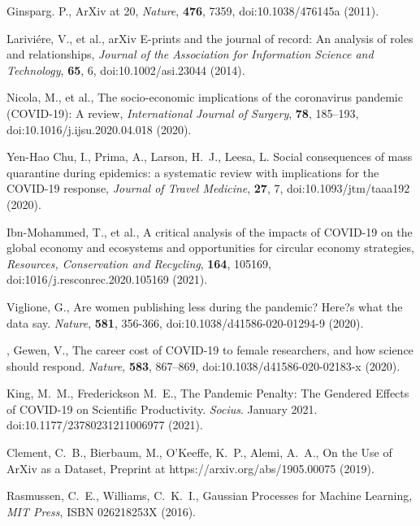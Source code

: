 \documentclass[]{rsos}%
\begin{document}
\begin{thebibliography}{10}

{Ginsparg}. P., {ArXiv at 20}, \emph{Nature}, \textbf{476}, 7359, doi:10.1038/476145a \newblock (2011).

{Larivi{\'e}re, V., et al.,} {arXiv E-prints and the journal of record: An analysis of roles and relationships}, \emph{Journal of the Association for Information Science and Technology}, \textbf{65}, 6, doi:10.1002/asi.23044 \newblock (2014).


{Nicola, M., et al.,} {The socio-economic implications of the coronavirus pandemic ({COVID}-19): A review}, \emph{International Journal of Surgery}, \textbf{78}, 185--193, doi:10.1016/j.ijsu.2020.04.018 \newblock (2020).

{Yen-Hao Chu, I., Prima, A., Larson, H.~J., Leesa, L.}
{Social consequences of mass quarantine during epidemics: a systematic review with implications for the {COVID}-19 response}, \emph{Journal of Travel Medicine}, \textbf{27}, 7, doi:10.1093/jtm/taaa192 \newblock (2020).

{Ibn-Mohammed, T., et al.,} {A critical analysis of the impacts of {COVID}-19 on the global economy and ecosystems and opportunities for circular economy strategies}, \emph{Resources, Conservation and Recycling}, \textbf{164}, 105169, doi:1016/j.resconrec.2020.105169 \newblock (2021).


{Viglione, G.}, {Are women publishing less during the pandemic? Here?s what the data say}. \emph{Nature}, \textbf{581}, 356-366, doi:10.1038/d41586-020-01294-9 \newblock (2020).


,
{Gewen, V.}, {The career cost of COVID-19 to female researchers, and how science should respond}. \emph{Nature}, \textbf{583}, 867--869, doi:10.1038/d41586-020-02183-x \newblock (2020).



{King, M.~M., Frederickson M.~E.}, {The Pandemic Penalty: The Gendered Effects of COVID-19 on Scientific Productivity}. \emph{Socius}. January 2021. doi:10.1177/23780231211006977 \newblock (2021).  


{Clement, C.~B., Bierbaum, M., O'Keeffe, K.~P., Alemi, A.~A.,}
{On the Use of ArXiv as a Dataset},
Preprint at https://arxiv.org/abs/1905.00075 \newblock (2019).

{Rasmussen, C.~E., Williams, C.~K.~I.,}
{Gaussian Processes for Machine Learning}, \emph{MIT Press}, ISBN 026218253X \newblock (2016).


\end{thebibliography}
\end{document}
